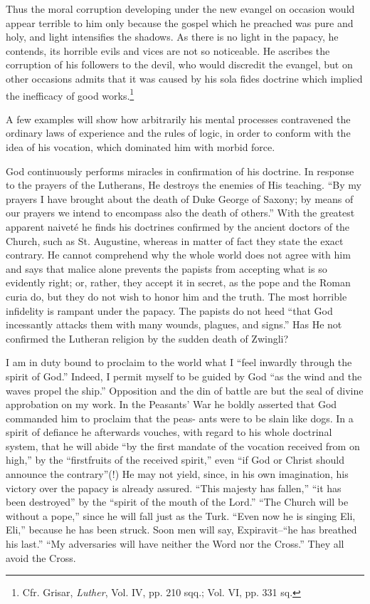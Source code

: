 Thus the moral corruption developing under the new evangel on occasion
would appear terrible to him only because the gospel which he preached was
pure and holy, and light intensifies the shadows. As there is no light in the
papacy, he contends, its horrible evils and vices are not so noticeable. He ascribes
the corruption of his followers to the devil, who would discredit the
evangel, but on other occasions admits that it was caused by his sola fides
doctrine which implied the inefficacy of good works.\footnote
{Cfr. Grisar, \textit{Luther}, Vol. IV, pp. 210 sqq.; Vol. VI, pp. 331 sq.}

A few examples will show how arbitrarily his mental processes contravened
the ordinary laws of experience and the rules of logic, in order to
conform with the idea of his vocation, which dominated him with morbid
force.

God continuously performs miracles in confirmation of his doctrine. In
response to the prayers of the Lutherans, He destroys the enemies of His
teaching. “By my prayers I have brought about the death of Duke George
of Saxony; by means of our prayers we intend to encompass also the death of
others.” With the greatest apparent naiveté he finds his doctrines confirmed
by the ancient doctors of the Church, such as St. Augustine, whereas in
matter of fact they state the exact contrary. He cannot comprehend why
the whole world does not agree with him and says that malice alone prevents
the papists from accepting what is so evidently right; or, rather, they
accept it in secret, as the pope and the Roman curia do, but they do not
wish to honor him and the truth. The most horrible infidelity is rampant
under the papacy. The papists do not heed “that God incessantly attacks
them with many wounds, plagues, and signs.” Has He not confirmed the
Lutheran religion by the sudden death of Zwingli?

I am in duty bound to proclaim to the world what I “feel inwardly
through the spirit of God.” Indeed, I permit myself to be guided by God
``as the wind and the waves propel the ship.'' Opposition and the din of
battle are but the seal of divine approbation on my work. In the Peasants’
War he boldly asserted that God commanded him to proclaim that the peas-
ants were to be slain like dogs. In a spirit of defiance he afterwards vouches,
with regard to his whole doctrinal system, that he will abide “by the first
mandate of the vocation received from on high,” by the “firstfruits of the
received spirit,” even “if God or Christ should announce the contrary”(!)
He may not yield, since, in his own imagination, his victory over the papacy
is already assured. “This majesty has fallen,” “it has been destroyed” by the
``spirit of the mouth of the Lord.'' “The Church will be without a pope,”
since he will fall just as the Turk. “Even now he is singing Eli, Eli,” because
he has been struck. Soon men will say, Expiravit--``he has breathed his
last.” “My adversaries will have neither the Word nor the Cross.” They all
avoid the Cross.

